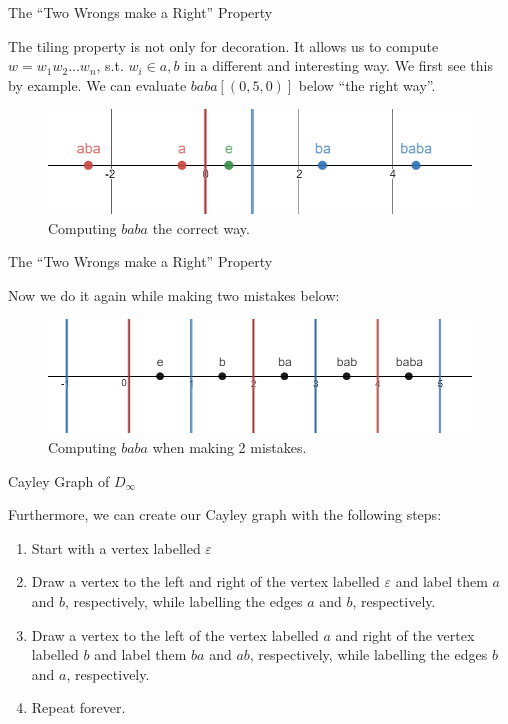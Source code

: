\documentclass[usenames,dvipsnames]{beamer}
\begin{document}
\begin{frame}{The ``Two Wrongs make a Right'' Property}

The tiling property is not only for decoration. It allows us to compute $w=w_{1}w_{2}\ldots w_{n}$, s.t.
$w_{i}\in {a,b}$ in a different and interesting way. We first see this by example. We can evaluate
$baba[(0,5,0)]$ below ``the right way''.

\begin{figure}[h]
    \centering
    \includegraphics[width=1\textwidth]{images/2-03-Computing_baba.png}
    \caption{Computing $baba$ the correct way.}
\end{figure}

\end{frame}

\begin{frame}{The ``Two Wrongs make a Right'' Property}

Now we do it again while making two mistakes below:

\begin{figure}[h]
    \centering
    \includegraphics[width=1\textwidth]{images/2-04-Wrong_Way.png}
    \caption{Computing $baba$ when making 2 mistakes.}
\end{figure}

\end{frame}

\begin{frame}{Cayley Graph of $D_\infty$}

Furthermore, we can create our Cayley graph with the following steps:

\begin{enumerate}
  \item Start with a vertex labelled $\varepsilon$
  \item Draw a vertex to the left and right of the vertex labelled $\varepsilon$ and label them $a$ and
  $b$, respectively, while labelling the edges $a$ and $b$, respectively.
  \item Draw a vertex to the left of the vertex labelled $a$ and right of the vertex labelled $b$ and label
  them $ba$ and $ab$, respectively, while labelling the edges $b$ and $a$, respectively.
  \item Repeat forever.
\end{enumerate}

\end{frame}
\end{document}
